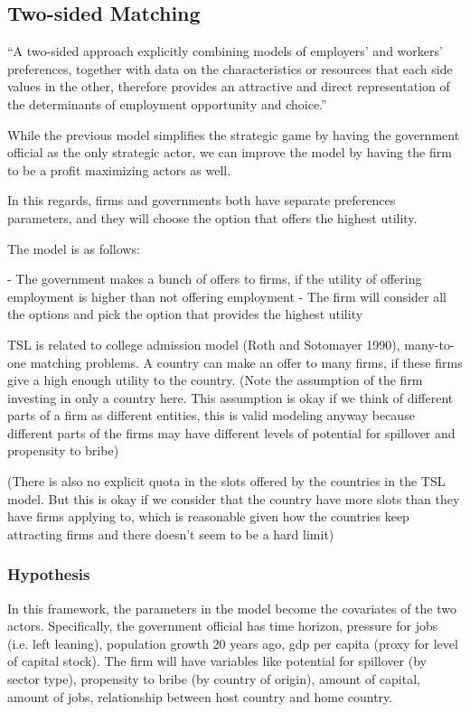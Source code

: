 \subsection{Two-sided Matching}

``A two-sided approach explicitly combining models of employers' and workers' preferences, together with data on the characteristics or resources that each side values in the other, therefore provides an attractive and direct representation of the determinants of employment opportunity and choice.''

While the previous model simplifies the strategic game by having the government official as the only strategic actor, we can improve the model by having the firm to be a profit maximizing actors as well.

In this regards, firms and governments both have separate preferences parameters, and they will choose the option that offers the highest utility.

The model is as follows:

- The government makes a bunch of offers to firms, if the utility of offering employment is higher than not offering employment
- The firm will consider all the options and pick the option that provides the highest utility

TSL is related to college admission model (Roth and Sotomayer 1990), many-to-one matching problems. A country can make an offer to many firms, if these firms give a high enough utility to the country. (Note the assumption of the firm investing in only a country here. This assumption is okay if we think of different parts of a firm as different entities, this is valid modeling anyway because different parts of the firms may have different levels of potential for spillover and propensity to bribe)

(There is also no explicit quota in the slots offered by the countries in the TSL model. But this is okay if we consider that the country have more slots than they have firms applying to, which is reasonable given how the countries keep attracting firms and there doesn't seem to be a hard limit)

\subsubsection{Hypothesis}

In this framework, the parameters in the model become the covariates of the two actors. Specifically, the government official has time horizon, pressure for jobs (i.e. left leaning), population growth 20 years ago, gdp per capita (proxy for level of capital stock). The firm will have variables like potential for spillover (by sector type), propensity to bribe (by country of origin), amount of capital, amount of jobs, relationship between host country and home country.

